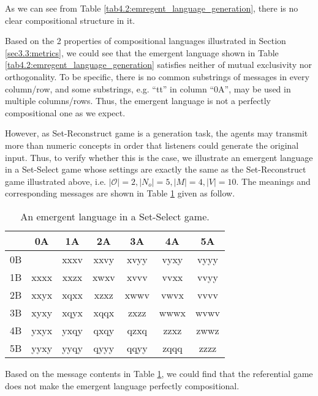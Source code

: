 As we can see from Table \ref{tab4.2:emregent_language_generation}, there is no clear compositional structure in it. 

Based on the 2 properties of compositional languages illustrated in Section \ref{sec3.3:metrics}, we could see that the emergent language shown in Table \ref{tab4.2:emregent_language_generation} satisfies neither of mutual exclusivity nor orthogonality. To be specific, there is no common substrings of messages in every column/row, and some substrings, e.g. ``tt'' in column ``0A'', may be used in multiple columns/rows. Thus, the emergent language is not a perfectly compositional one as we expect.

However, as Set-Reconstruct game is a generation task, the agents may transmit more than numeric concepts in order that listeners could generate the original input. Thus, to verify whether this is the case, we illustrate an emergent language in a Set-Select game whose settings are exactly the same as the Set-Reconstruct game illustrated above, i.e. $|\mathcal{O}|=2, |N_o|=5, |M|=4, |V|=10$. The meanings and corresponding messages are shown in Table \ref{tab4.3:emregent_language_referential} given as follow.

\begin{table}[!h]
    \centering
    \begin{tabular}{|c|c|c|c|c|c|c|}
        \hline
           & 0A   & 1A   & 2A   & 3A   & 4A   & 5A   \\ \hline
        0B &      & xxxv & xxvy & xvyy & vyxy & vyyy \\ \hline
        1B & xxxx & xxzx & xwxv & xvvv & vvxx & vvyy \\ \hline
        2B & xxyx & xqxx & xzxz & xwwv & vwvx & vvvv \\ \hline
        3B & xyxy & xqyx & xqqx & zxzz & wwwx & wvwv \\ \hline
        4B & yxyx & yxqy & qxqy & qzxq & zzxz & zwwz \\ \hline
        5B & yyxy & yyqy & qyyy & qqyy & zqqq & zzzz \\ \hline
        \end{tabular}
    \caption{An emergent language in a Set-Select game.}
    \label{tab4.3:emregent_language_referential}
\end{table}

Based on the message contents in Table \ref{tab4.3:emregent_language_referential}, we could find that the referential game does not make the emergent language perfectly compositional. 

